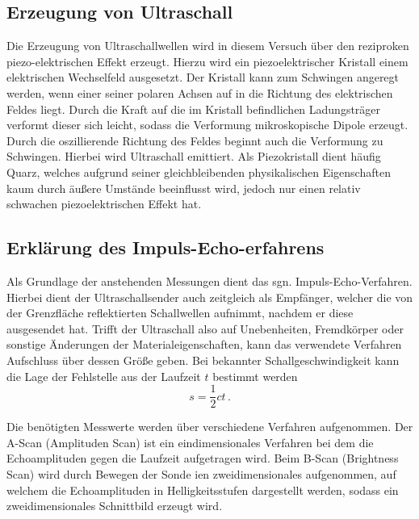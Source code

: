 \subsection{Erzeugung von Ultraschall}
\label{sec:Erzeugung}
Die Erzeugung von Ultraschallwellen wird in diesem Versuch über den reziproken piezo-elektrischen Effekt erzeugt.
Hierzu wird ein piezoelektrischer Kristall einem elektrischen Wechselfeld ausgesetzt.
Der Kristall kann zum Schwingen angeregt werden, wenn einer seiner polaren Achsen auf in die Richtung des elektrischen Feldes liegt.
Durch die Kraft auf die im Kristall befindlichen Ladungsträger verformt dieser sich leicht, sodass die Verformung mikroskopische Dipole erzeugt.
Durch die oszillierende Richtung des Feldes beginnt auch die Verformung zu Schwingen.
Hierbei wird Ultraschall emittiert. 
Als Piezokristall dient häufig Quarz, welches aufgrund seiner gleichbleibenden physikalischen Eigenschaften kaum durch äußere Umstände beeinflusst wird, jedoch
nur einen relativ schwachen piezoelektrischen Effekt hat.

\subsection{Erklärung des Impuls-Echo-erfahrens}
\label{sec:Impuls-Echo}
Als Grundlage der anstehenden Messungen dient das sgn. Impuls-Echo-Verfahren.
Hierbei dient der Ultraschallsender auch zeitgleich als Empfänger, welcher die von der Grenzfläche reflektierten Schallwellen aufnimmt, nachdem er diese ausgesendet hat. 
Trifft der Ultraschall also auf Unebenheiten, Fremdkörper oder sonstige Änderungen der Materialeigenschaften, kann das verwendete Verfahren Aufschluss über dessen Größe geben. 
Bei bekannter Schallgeschwindigkeit kann die Lage der Fehlstelle aus der Laufzeit $t$ bestimmt werden
\begin{equation*}
    s=\frac{1}{2}ct\, .
\end{equation*}

Die benötigten Messwerte werden über verschiedene Verfahren aufgenommen.
Der A-Scan (Amplituden Scan) ist ein eindimensionales Verfahren bei dem die Echoamplituden gegen die Laufzeit aufgetragen wird. Beim B-Scan (Brightness Scan) wird durch Bewegen der Sonde ien zweidimensionales aufgenommen,
auf welchem die Echoamplituden in Helligkeitsstufen dargestellt werden, sodass ein zweidimensionales Schnittbild erzeugt wird.
